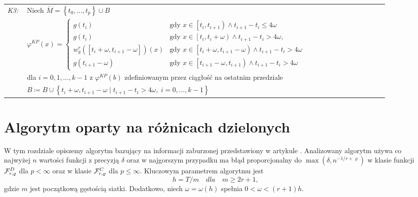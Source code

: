 \documentclass[oik, pdftex, robocza, man]{mgrwms}
\begin{document}
\begin{tabular}{p{0.045\linewidth} p{0.85\linewidth}}
        \textit{K3:}    & Niech $\bar{M} = \left\{ t_{0}, \dots, t_{p} \right\} \cup B$ \\
                        & $\varphi^{KP}(x)= \begin{cases}
                            g\left(t_{i}\right)                                                 &\text{gdy } x \in \left[t_{i}, t_{i+1}\right) \land t_{i+1}-t_{i} \leq 4 \omega \\ 
                            g\left(t_{i}\right)                                                 &\text{gdy } x \in \left[t_{i}, t_{i}+\omega\right) \land t_{i+1}-t_{i}>4 \omega, \\ 
                            w_{g}^{r}\left(\left[t_{i}+\omega, t_{i+1}-\omega\right]\right)(x)  &\text{gdy } x \in\left[t_{i}+\omega, t_{i+1}-\omega\right) \land t_{i+1}-t_{i}>4 \omega \\ 
                            g\left(t_{i+1}-\omega\right)                                        &\text{gdy } x \in\left[t_{i+1}-\omega, t_{i+1}\right) \land t_{i+1}-t_{i}>4 \omega
                            \end{cases}$ \vspace{3pt} \\
                        & dla $i=0,1,\dots,k-1$ z $\varphi^{KP}(b) $ zdefiniowanym przez ciągłość na ostatnim przedziale \\
                        & $B \coloneqq B \cup \left\{ t_{i} + \omega, t_{i+1} - \omega \mid t_{i+1} - t_{i} > 4\omega,\; i=0,\dots,k-1 \right\}$ \\

    \end{tabular} \vspace{10pt}


\section{Algorytm oparty na różnicach dzielonych}


    W tym rozdziale opiszemy algorytm bazujący na informacji zaburzonej przedstawiony w artykule \cite{AoP}. Analizowany algorytm używa co najwyżej $n$ wartości funkcji z precyzją $\delta $ oraz w najgorszym przypadku ma błąd proporcjonalny do $\max{(\delta, n^{-1 / r + \varrho })}$ w klasie funkcji $\mathcal{F}^D_{r,\varrho }$ dla $p < \infty$ oraz w klasie $\mathcal{F}^C_{r,\varrho }$ dla $p \leq \infty$. Kluczowym parametrem algorytmu jest
    $$
        h = T / m \quad dla \quad  m \geq 2r + 1,
    $$
    gdzie $m$ jest początkową gęstością siatki. Dodatkowo, niech $\omega  = \omega(h)$ spełnia $0 < \omega < (r + 1)h $.
\end{document}
